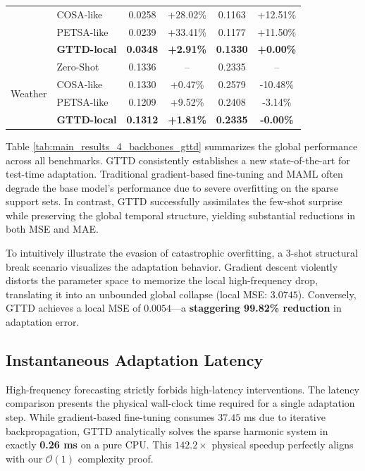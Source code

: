 \documentclass{article}
\begin{document}
\begin{table}[t]
\begin{tabular}{llcccc}
 & COSA-like & 0.0258 & +28.02\% & 0.1163 & +12.51\% \\
 & PETSA-like & 0.0239 & +33.41\% & 0.1177 & +11.50\% \\
 & \textbf{GTTD-local} & \textbf{0.0348} & \textbf{+2.91\%} & \textbf{0.1330} & \textbf{+0.00\%} \\
\midrule
\multirow{4}{*}{Weather} & Zero-Shot & 0.1336 & -- & 0.2335 & -- \\
 & COSA-like & 0.1330 & +0.47\% & 0.2579 & -10.48\% \\
 & PETSA-like & 0.1209 & +9.52\% & 0.2408 & -3.14\% \\
 & \textbf{GTTD-local} & \textbf{0.1312} & \textbf{+1.81\%} & \textbf{0.2335} & \textbf{-0.00\%} \\
\bottomrule
\end{tabular}
\end{table}



Table \ref{tab:main_results_4_backbones_gttd} summarizes the global performance across all benchmarks. GTTD consistently establishes a new state-of-the-art for test-time adaptation. Traditional gradient-based fine-tuning and MAML often degrade the base model's performance due to severe overfitting on the sparse support sets. In contrast, GTTD successfully assimilates the few-shot surprise while preserving the global temporal structure, yielding substantial reductions in both MSE and MAE.


To intuitively illustrate the evasion of catastrophic overfitting, a 3-shot structural break scenario visualizes the adaptation behavior. Gradient descent violently distorts the parameter space to memorize the local high-frequency drop, translating it into an unbounded global collapse (local MSE: $3.0745$). Conversely, GTTD achieves a local MSE of $0.0054$---a \textbf{staggering 99.82\% reduction} in adaptation error.

\subsection{Instantaneous Adaptation Latency}


High-frequency forecasting strictly forbids high-latency interventions. The latency comparison presents the physical wall-clock time required for a single adaptation step. While gradient-based fine-tuning consumes $37.45$ ms due to iterative backpropagation, GTTD analytically solves the sparse harmonic system in exactly \textbf{0.26 ms} on a pure CPU. This $142.2\times$ physical speedup perfectly aligns with our $\mathcal{O}(1)$ complexity proof.
\end{document}
